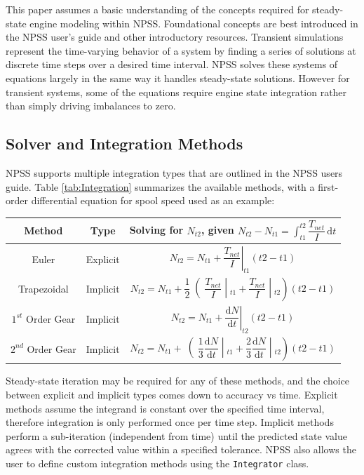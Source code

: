 \documentclass[heading.tex]{subfiles}
\begin{document}
This paper assumes a basic understanding of the concepts required for steady-state engine modeling within NPSS.
Foundational concepts are best introduced in the NPSS user's guide \cite{NPSS} and other introductory resources. \cite{JonesIntro} 
Transient simulations represent the time-varying behavior of a system by finding a series of
solutions at discrete time steps over a desired time interval. NPSS solves these systems of
equations largely in the same way it handles steady-state solutions. However for transient
systems, some of the equations require engine state integration rather than simply driving imbalances to zero.


\subsection{Solver and Integration Methods}
NPSS supports multiple integration types that are outlined in the NPSS users guide.
\cite[chap.~7.1]{NPSS} Table \ref{tab:Integration} summarizes the available methods, with a 
first-order differential equation for spool speed used as an example: 

\begin{minipage}{\linewidth}
\centering
\bigskip
{} \label{tab:Integration}
\begin{tabular}{|c|c|c|}
\hline 
Method & Type & Solving for  $N_{t2}$, given  $N_{t2}- N_{t1}= \int_{t1}^{t2} \! \dfrac{T_{net}}{I} \, \mathrm{d}t $\\ 
\hline 
Euler & Explicit & $ \left.N_{t2}= N_{t1} + \dfrac{T_{net}}{I} \right|_{t1}^{}(t2-t1)$ \\ 
\hline 
Trapezoidal & Implicit & $ \left.N_{t2}= N_{t1} + \dfrac{1}{2}\middle(\dfrac{T_{net}}{I} \middle|_{t1}^{}+\dfrac{T_{net}}{I} \middle|_{t2}^{}\right)(t2-t1)$ \\ 
\hline 
$1^{st}$ Order Gear & Implicit & $ \left.N_{t2}= N_{t1} + \dfrac{ \mathrm{d}N }{ \mathrm{d}t } \right|_{t2}^{}(t2-t1)$ \\ 
\hline 
$2^{nd}$ Order Gear & Implicit & $ \left.N_{t2}= N_{t1} + \middle(\dfrac{1}{3}\dfrac{ \mathrm{d}N }{ \mathrm{d}t }\middle|_{t1}^{}+\dfrac{2}{3}\dfrac{ \mathrm{d}N }{ \mathrm{d}t }\middle|_{t2}^{}\right)(t2-t1)$ \\ 
\hline 
\end{tabular} 
\end{minipage}

Steady-state iteration may be required for any of these methods, and the choice between explicit
and implicit types comes down to accuracy vs time. Explicit methods assume the integrand is
constant over the specified time interval, therefore integration is only performed once per time
step. Implicit methods perform a sub-iteration (independent from time) until the predicted state
value agrees with the corrected value within a specified tolerance. NPSS also allows the user to
define custom integration methods using the \texttt{Integrator} class. \cite[chap.~15.2]{NPSS}  
\end{document}
